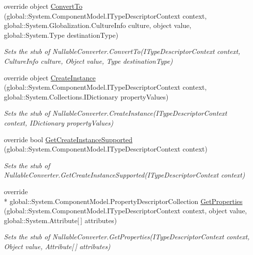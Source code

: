 \begin{DoxyCompactItemize}
override object \hyperlink{class_system_1_1_component_model_1_1_fakes_1_1_stub_nullable_converter_a9de4212cd7508d0521b935ba21db7441}{Convert\-To} (global\-::\-System.\-Component\-Model.\-I\-Type\-Descriptor\-Context context, global\-::\-System.\-Globalization.\-Culture\-Info culture, object value, global\-::\-System.\-Type destination\-Type)
\begin{DoxyCompactList}\small\item\em Sets the stub of Nullable\-Converter.\-Convert\-To(\-I\-Type\-Descriptor\-Context context, Culture\-Info culture, Object value, Type destination\-Type)\end{DoxyCompactList}\item 
override object \hyperlink{class_system_1_1_component_model_1_1_fakes_1_1_stub_nullable_converter_a6127935bcb6b9a6ac890f7f1d4e8aaca}{Create\-Instance} (global\-::\-System.\-Component\-Model.\-I\-Type\-Descriptor\-Context context, global\-::\-System.\-Collections.\-I\-Dictionary property\-Values)
\begin{DoxyCompactList}\small\item\em Sets the stub of Nullable\-Converter.\-Create\-Instance(\-I\-Type\-Descriptor\-Context context, I\-Dictionary property\-Values)\end{DoxyCompactList}\item 
override bool \hyperlink{class_system_1_1_component_model_1_1_fakes_1_1_stub_nullable_converter_af53b86150859889edf73ce16be5ce1b8}{Get\-Create\-Instance\-Supported} (global\-::\-System.\-Component\-Model.\-I\-Type\-Descriptor\-Context context)
\begin{DoxyCompactList}\small\item\em Sets the stub of Nullable\-Converter.\-Get\-Create\-Instance\-Supported(\-I\-Type\-Descriptor\-Context context)\end{DoxyCompactList}\item 
override \\*
global\-::\-System.\-Component\-Model.\-Property\-Descriptor\-Collection \hyperlink{class_system_1_1_component_model_1_1_fakes_1_1_stub_nullable_converter_ad96ee4dbb2211af282cd948d8522d6ca}{Get\-Properties} (global\-::\-System.\-Component\-Model.\-I\-Type\-Descriptor\-Context context, object value, global\-::\-System.\-Attribute\mbox{[}$\,$\mbox{]} attributes)
\begin{DoxyCompactList}\small\item\em Sets the stub of Nullable\-Converter.\-Get\-Properties(\-I\-Type\-Descriptor\-Context context, Object value, Attribute\mbox{[}$\,$\mbox{]} attributes)\end{DoxyCompactList}\item 

\end{DoxyCompactItemize}
